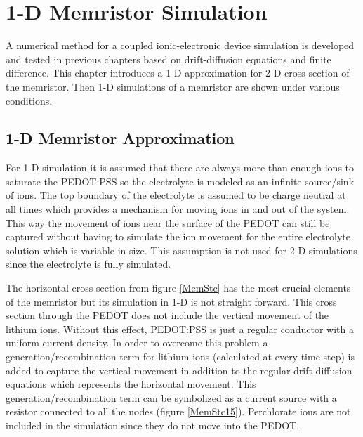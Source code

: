 
\chapter{1-D Memristor Simulation} %

\label{Chapter6} %


\begin{doublespace}

A numerical method for a coupled ionic-electronic device simulation is developed and tested in previous chapters based on drift-diffusion equations and finite difference. This chapter introduces a 1-D approximation for 2-D cross section of the memristor. Then 1-D simulations of a memristor are shown under various conditions.


\section{1-D Memristor Approximation}

For 1-D simulation it is assumed that there are always more than enough ions to saturate the PEDOT:PSS so the electrolyte is modeled as an infinite source/sink of ions. The top boundary of the electrolyte is assumed to be charge neutral at all times which provides a mechanism for moving ions in and out of the system. This way the movement of ions near the surface of the PEDOT can still be captured without having to simulate the ion movement for the entire electrolyte solution which is variable in size. This assumption is not used for 2-D simulations since the electrolyte is fully simulated.
 
The horizontal cross section from figure \ref{MemStc} has the most crucial elements of the memristor but its simulation in 1-D is not straight forward. This cross section through the PEDOT does not include the vertical movement of the lithium ions. Without this effect, PEDOT:PSS is just a regular conductor with a uniform current density. In order to overcome this problem a generation/recombination term for lithium ions (calculated at every time step) is added to capture the vertical movement in addition to the regular drift diffusion equations which represents the horizontal movement. This generation/recombination term can be symbolized as a current source with a resistor connected to all the nodes (figure \ref{MemStc15}). Perchlorate ions are not included in the simulation since they do not move into the PEDOT.


\end{doublespace}
